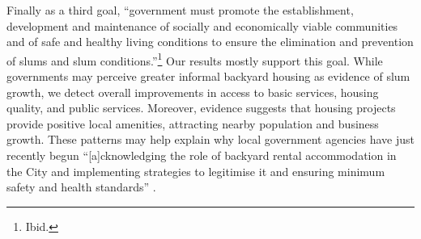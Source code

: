 \documentclass[12pt]{article}
\begin{document}

Finally as a third goal, ``government must promote the establishment, development and maintenance of socially and economically viable communities and of safe and healthy living conditions to ensure the elimination and prevention of slums and slum conditions.''\footnote{Ibid.}  Our results mostly support this goal.  While governments may perceive greater informal backyard housing as evidence of slum growth, we detect overall improvements in access to basic services, housing quality, and public services.  Moreover, evidence suggests that housing projects provide positive local amenities, attracting nearby population and business growth.  These patterns may help explain why local government agencies have just recently begun ``[a]cknowledging the role of backyard rental accommodation in the City and implementing strategies to legitimise it and ensuring minimum safety and health standards'' \citep{sdf}.




\end{document}
